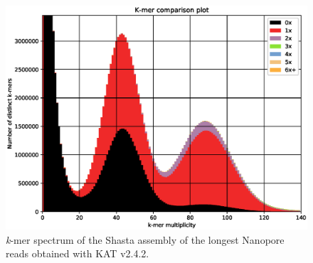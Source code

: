 \begin{suppsection}
    \begin{figure}[ht]
    \centering
     \includegraphics[width=13.5cm]{fig/benchmark/kat_comp_shasta_min30000_1-main.mx.spectra-cn.eps}
   \caption{\textit{k}-mer spectrum of the Shasta assembly of the longest Nanopore reads obtained with KAT v2.4.2.}
   \label{fig:kat_shasta_min30000}
 \end{figure}
 

\end{suppsection}
